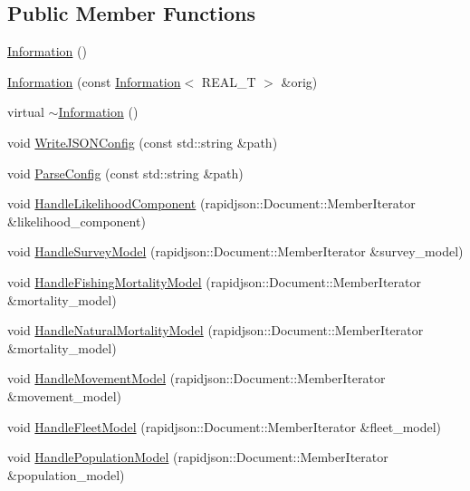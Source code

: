 \subsection*{Public Member Functions}
\begin{DoxyCompactItemize}
\item 
\hyperlink{classmas_1_1_information_aff6ea69c6e89a795900043e3ee6b25b3}{Information} ()
\item 
\hyperlink{classmas_1_1_information_a01305102ef89867b1fbdc545c4af3893}{Information} (const \hyperlink{classmas_1_1_information}{Information}$<$ R\-E\-A\-L\-\_\-\-T $>$ \&orig)
\item 
virtual \hyperlink{classmas_1_1_information_a22f67a9193a45e1d7917e96e6f79bcb0}{$\sim$\-Information} ()
\item 
void \hyperlink{classmas_1_1_information_a87d31bf74b83b4d90cc49a6ce0830da5}{Write\-J\-S\-O\-N\-Config} (const std\-::string \&path)
\item 
void \hyperlink{classmas_1_1_information_a7637882f3b75458d88dee1075f2483f0}{Parse\-Config} (const std\-::string \&path)
\item 
void \hyperlink{classmas_1_1_information_aed7467a3ffe58e76ef6910f4f3dc1d95}{Handle\-Likelihood\-Component} (rapidjson\-::\-Document\-::\-Member\-Iterator \&likelihood\-\_\-component)
\item 
void \hyperlink{classmas_1_1_information_ace06cf6d7f8c2c65bcc5264fcdea7808}{Handle\-Survey\-Model} (rapidjson\-::\-Document\-::\-Member\-Iterator \&survey\-\_\-model)
\item 
void \hyperlink{classmas_1_1_information_a390e0c06f1dde7a6971fdc58bc3faa94}{Handle\-Fishing\-Mortality\-Model} (rapidjson\-::\-Document\-::\-Member\-Iterator \&mortality\-\_\-model)
\item 
void \hyperlink{classmas_1_1_information_ad07e1708a544dd3f31184793b1985136}{Handle\-Natural\-Mortality\-Model} (rapidjson\-::\-Document\-::\-Member\-Iterator \&mortality\-\_\-model)
\item 
void \hyperlink{classmas_1_1_information_a5f5c3c867caa0875099f7619842c4897}{Handle\-Movement\-Model} (rapidjson\-::\-Document\-::\-Member\-Iterator \&movement\-\_\-model)
\item 
void \hyperlink{classmas_1_1_information_aaf3678eaf754f85e15b713271b2ca29d}{Handle\-Fleet\-Model} (rapidjson\-::\-Document\-::\-Member\-Iterator \&fleet\-\_\-model)
\item 
void \hyperlink{classmas_1_1_information_a45a60ea2a7c1082e8f73da9822056afd}{Handle\-Population\-Model} (rapidjson\-::\-Document\-::\-Member\-Iterator \&population\-\_\-model)

\end{DoxyCompactItemize}
